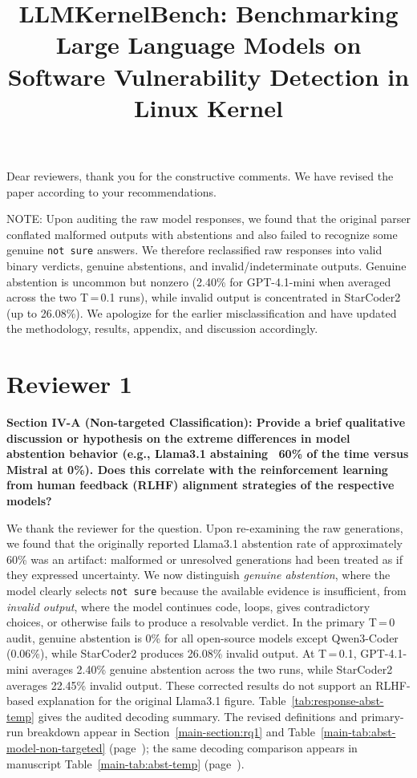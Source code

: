 \documentclass[journal,onecolumn]{IEEEtran}
\begin{document}
\title{LLMKernelBench: Benchmarking Large Language Models on Software Vulnerability Detection in Linux Kernel}

\maketitle

Dear reviewers, thank you for the constructive comments. We have revised the paper according to your recommendations.

NOTE: Upon auditing the raw model responses, we found that the original parser conflated malformed outputs with abstentions and also failed to recognize some genuine \texttt{not sure} answers. We therefore reclassified raw responses into valid binary verdicts, genuine abstentions, and invalid/indeterminate outputs. Genuine abstention is uncommon but nonzero (2.40\% for GPT-4.1-mini when averaged across the two T\,=\,0.1 runs), while invalid output is concentrated in StarCoder2 (up to 26.08\%). We apologize for the earlier misclassification and have updated the methodology, results, appendix, and discussion accordingly.

\section{Reviewer 1}

\textbf{Section IV-A (Non-targeted Classification): Provide a brief qualitative discussion or hypothesis on the extreme differences in model abstention behavior (e.g., Llama3.1 abstaining ~60\% of the time versus Mistral at 0\%). Does this correlate with the reinforcement learning from human feedback (RLHF) alignment strategies of the respective models?}

We thank the reviewer for the question. Upon re-examining the raw generations, we found that the originally reported Llama3.1 abstention rate of approximately 60\% was an artifact: malformed or unresolved generations had been treated as if they expressed uncertainty. We now distinguish \emph{genuine abstention}, where the model clearly selects \texttt{not sure} because the available evidence is insufficient, from \emph{invalid output}, where the model continues code, loops, gives contradictory choices, or otherwise fails to produce a resolvable verdict. In the primary T\,=\,0 audit, genuine abstention is 0\% for all open-source models except Qwen3-Coder (0.06\%), while StarCoder2 produces 26.08\% invalid output. At T\,=\,0.1, GPT-4.1-mini averages 2.40\% genuine abstention across the two runs, while StarCoder2 averages 22.45\% invalid output. These corrected results do not support an RLHF-based explanation for the original Llama3.1 figure. Table~\ref{tab:response-abst-temp} gives the audited decoding summary. The revised definitions and primary-run breakdown appear in Section~\ref{main-section:rq1} and Table~\ref{main-tab:abst-model-non-targeted} (page~\pageref{main-tab:abst-model-non-targeted}); the same decoding comparison appears in manuscript Table~\ref{main-tab:abst-temp} (page~\pageref{main-tab:abst-temp}).
\end{document}
